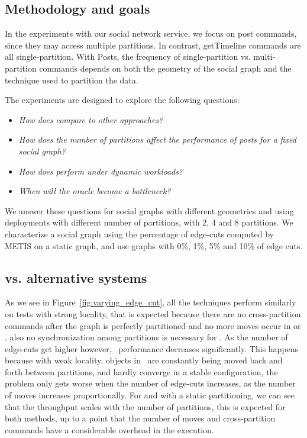 \subsection{Methodology and goals}
\label{sec:evaluation:methodology}

In the experiments with our social network service, we focus on post
commands, since they may access multiple partitions. In contrast,
getTimeline commands are all single-partition.  With Posts, the
frequency of single-partition vs. multi-partition commands depends on
both the geometry of the social graph and the technique used to
partition the data.

The experiments are designed to explore the following questions:
\begin{itemize}
\item \emph{How does \dynastar compare to other approaches?} 
\item \emph{How does the number of partitions affect the performance of posts for a fixed social graph?}
\item \emph{How does \dynastar perform under dynamic workloads?}
\item \emph{When will the oracle become a bottleneck?}
\end{itemize}

We answer these questions for social graphs with different geometries
and using deployments with different number of partitions, with 2, 4
and 8 partitions.  We characterize a social graph using the percentage
of edge-cuts computed by METIS on a static graph, and use graphs with
0\%, 1\%, 5\% and 10\% of edge cuts.


\subsection{\dynastar vs. alternative systems}
\label{sec:evaluation:results}

As we see in Figure~\ref{fig:varying_edge_cut}, all the techniques
perform similarly on tests with strong locality, that is expected
because there are no cross-partition commands after the graph is
perfectly partitioned and no more moves occur in \dynastar or \dssmr,
also no synchronization among partitions is necessary for \ssmr.  As
the number of edge-cuts get higher however, \dssmr\ performance
decreases significantly.  This happens because with weak locality,
objects in \dssmr\ are constantly being moved back and forth between
partitions, and hardly converge in a stable configuration, the problem
only gets worse when the number of edge-cuts increases, as the number
of moves increases proportionally.  For \dynastar and \ssmr with a
static partitioning, we can see that the throughput scales with the
number of partitions, this is expected for both methods, up to a point
that the number of moves and cross-partition commands have a
considerable overhead in the execution.

